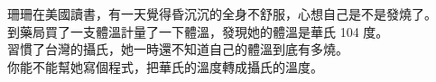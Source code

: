 珊珊在美國讀書，有一天覺得昏沉沉的全身不舒服，心想自己是不是發燒了。\\
到藥局買了一支體溫計量了一下體溫，發現她的體溫是華氏 104 度。\\
習慣了台灣的攝氏，她一時還不知道自己的體溫到底有多燒。\\
你能不能幫她寫個程式，把華氏的溫度轉成攝氏的溫度。\\
